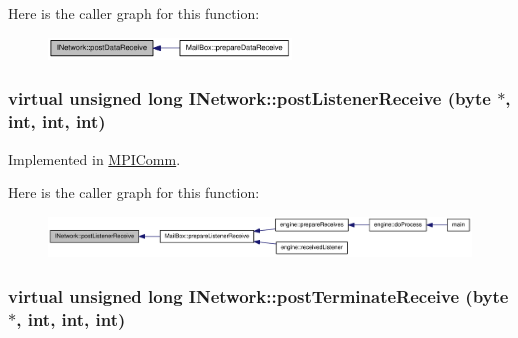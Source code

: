 Here is the caller graph for this function:\nopagebreak
\begin{figure}[H]
\begin{center}
\leavevmode
\includegraphics[width=183pt]{class_i_network_aa1b87ec0d7a1f6d6a2956f05afcc3c81_icgraph}
\end{center}
\end{figure}
\hypertarget{class_i_network_a60a1f567df811d09fc1774bc439ea349}{
\subsubsection[{postListenerReceive}]{\setlength{\rightskip}{0pt plus 5cm}virtual unsigned long INetwork::postListenerReceive ({\bf byte} $\ast$, \/  int, \/  int, \/  int)}}
\label{class_i_network_a60a1f567df811d09fc1774bc439ea349}


Implemented in \hyperlink{class_m_p_i_comm_a37121a71b4636a713e4b3b0655efbc6e}{MPIComm}.

Here is the caller graph for this function:\nopagebreak
\begin{figure}[H]
\begin{center}
\leavevmode
\includegraphics[width=382pt]{class_i_network_a60a1f567df811d09fc1774bc439ea349_icgraph}
\end{center}
\end{figure}
\hypertarget{class_i_network_ae8381635a24542ac374056c15613daeb}{
\subsubsection[{postTerminateReceive}]{\setlength{\rightskip}{0pt plus 5cm}virtual unsigned long INetwork::postTerminateReceive ({\bf byte} $\ast$, \/  int, \/  int, \/  int)}}
\label{class_i_network_ae8381635a24542ac374056c15613daeb}


